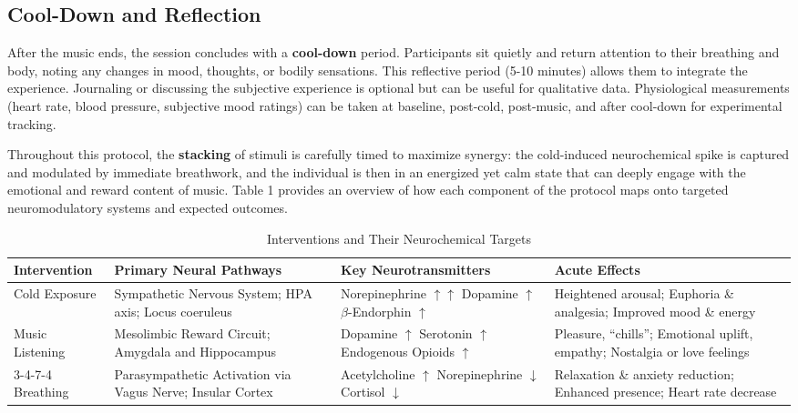 \documentclass[11pt]{article}
\newcommand{\quotes}[1]{``#1''}
\begin{document}
\subsection{Cool-Down and Reflection}
After the music ends, the session concludes with a \textbf{cool-down} period. Participants sit quietly and return attention to their breathing and body, noting any changes in mood, thoughts, or bodily sensations. This reflective period (5-10 minutes) allows them to integrate the experience. Journaling or discussing the subjective experience is optional but can be useful for qualitative data. Physiological measurements (heart rate, blood pressure, subjective mood ratings) can be taken at baseline, post-cold, post-music, and after cool-down for experimental tracking.

Throughout this protocol, the \textbf{stacking} of stimuli is carefully timed to maximize synergy: the cold-induced neurochemical spike is captured and modulated by immediate breathwork, and the individual is then in an energized yet calm state that can deeply engage with the emotional and reward content of music. Table 1 provides an overview of how each component of the protocol maps onto targeted neuromodulatory systems and expected outcomes.

\begin{table}[ht]
\caption{Interventions and Their Neurochemical Targets}
\centering
\begin{tabular}{p{2.5cm}p{3cm}p{3cm}p{3cm}}
\toprule
\textbf{Intervention} & \textbf{Primary Neural Pathways} & \textbf{Key Neurotransmitters} & \textbf{Acute Effects} \\
\midrule
Cold Exposure & Sympathetic Nervous System; HPA axis; Locus coeruleus & Norepinephrine $\uparrow\uparrow$ \newline Dopamine $\uparrow$ \newline $\beta$-Endorphin $\uparrow$ & Heightened arousal; Euphoria \& analgesia; Improved mood \& energy \\
\midrule
Music Listening & Mesolimbic Reward Circuit; Amygdala and Hippocampus & Dopamine $\uparrow$ \newline Serotonin $\uparrow$ \newline Endogenous Opioids $\uparrow$ & Pleasure, \quotes{chills}; Emotional uplift, empathy; Nostalgia or love feelings \\
\midrule
3-4-7-4 Breathing & Parasympathetic Activation via Vagus Nerve; Insular Cortex & Acetylcholine $\uparrow$ \newline Norepinephrine $\downarrow$ \newline Cortisol $\downarrow$ & Relaxation \& anxiety reduction; Enhanced presence; Heart rate decrease \\
\bottomrule
\end{tabular}\label{tab:interventions}
\end{table}
\end{document}
